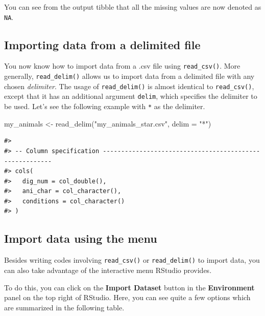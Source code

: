 \documentclass[
]{book}
\newenvironment{Shaded}{\begin{snugshade}}{\end{snugshade}}
\newcommand{\AttributeTok}[1]{\textcolor[rgb]{0.77,0.63,0.00}{#1}}
\newcommand{\FunctionTok}[1]{\textcolor[rgb]{0.00,0.00,0.00}{#1}}
\newcommand{\NormalTok}[1]{#1}
\newcommand{\OtherTok}[1]{\textcolor[rgb]{0.56,0.35,0.01}{#1}}
\newcommand{\StringTok}[1]{\textcolor[rgb]{0.31,0.60,0.02}{#1}}
\begin{document}
You can see from the output tibble that all the missing values are now denoted as \texttt{NA}.

\hypertarget{importing-data-from-a-delimited-file}{%
\subsection{Importing data from a delimited file}\label{importing-data-from-a-delimited-file}}

You now know how to import data from a .csv file using \texttt{read\_csv()}. More generally, \texttt{read\_delim()} allows us to import data from a delimited file with any chosen \emph{delimiter}. The usage of \texttt{read\_delim()} is almost identical to \texttt{read\_csv()}, except that it has an additional argument \texttt{delim}, which specifies the delimiter to be used. Let's see the following example with \texttt{*} as the delimiter.

\begin{Shaded}
\begin{Highlighting}[]
\NormalTok{my\_animals }\OtherTok{\textless{}{-}} \FunctionTok{read\_delim}\NormalTok{(}\StringTok{"my\_animals\_star.csv"}\NormalTok{, }\AttributeTok{delim =} \StringTok{"*"}\NormalTok{)}
\end{Highlighting}
\end{Shaded}

\begin{verbatim}
#> 
#> -- Column specification --------------------------------------------------------
#> cols(
#>   dig_num = col_double(),
#>   ani_char = col_character(),
#>   conditions = col_character()
#> )
\end{verbatim}

\hypertarget{import-menu}{%
\subsection{Import data using the menu}\label{import-menu}}

Besides writing codes involving \texttt{read\_csv()} or \texttt{read\_delim()} to import data, you can also take advantage of the interactive menu RStudio provides.

To do this, you can click on the \textbf{Import Dataset} button in the \textbf{Environment} panel on the top right of RStudio. Here, you can see quite a few options which are summarized in the following table.
\end{document}
